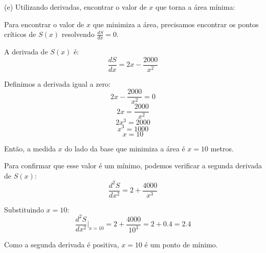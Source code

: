 \documentclass{article}
\begin{document}
(e) Utilizando derivadas, encontrar o valor de \( x \) que torna a área mínima:

Para encontrar o valor de \( x \) que minimiza a área, precisamos encontrar os pontos críticos de \( S(x) \) resolvendo \( \frac{dS}{dx} = 0 \).

A derivada de \( S(x) \) é:
\[ \frac{dS}{dx} = 2x - \frac{2000}{x^2} \]

Definimos a derivada igual a zero:
\[ 2x - \frac{2000}{x^2} = 0 \]
\[ 2x = \frac{2000}{x^2} \]
\[ 2x^3 = 2000 \]
\[ x^3 = 1000 \]
\[ x = 10 \]

Então, a medida \( x \) do lado da base que minimiza a área é \( x = 10 \) metros.

Para confirmar que esse valor é um mínimo, podemos verificar a segunda derivada de \( S(x) \):
\[ \frac{d^2S}{dx^2} = 2 + \frac{4000}{x^3} \]

Substituindo \( x = 10 \):
\[ \frac{d^2S}{dx^2}\bigg|_{x=10} = 2 + \frac{4000}{10^3} = 2 + 0.4 = 2.4 \]

Como a segunda derivada é positiva, \( x = 10 \) é um ponto de mínimo.
\end{document}
